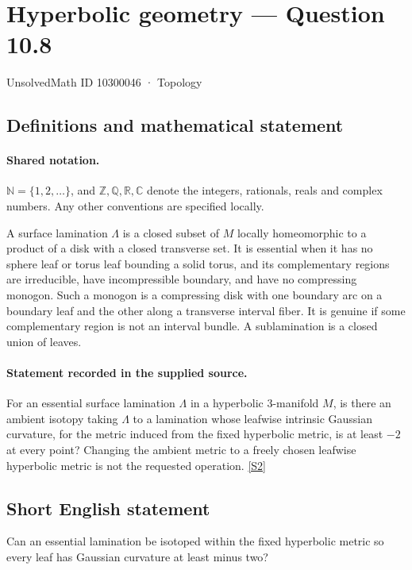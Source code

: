 \documentclass[11pt]{article}
\newcommand{\sref}[2]{\hyperlink{source:#1:#2}{[S#2]}}
\begin{document}
\setcounter{section}{10300045}
\section{Hyperbolic geometry — Question 10.8}\label{10300046}
{\small\sffamily UnsolvedMath ID 10300046 · Topology}
\subsection{Definitions and mathematical statement}

\paragraph{Shared notation.}$\mathbb N=\{1,2,\ldots\}$, and $\mathbb Z,\mathbb Q,\mathbb R,\mathbb C$ denote the integers, rationals, reals and complex numbers. Any other conventions are specified locally.


A surface lamination $\Lambda$ is a closed subset of $M$ locally homeomorphic to a product of a disk with a closed transverse set. It is essential when it has no sphere leaf or torus leaf bounding a solid torus, and its complementary regions are irreducible, have incompressible boundary, and have no compressing monogon. Such a monogon is a compressing disk with one boundary arc on a boundary leaf and the other along a transverse interval fiber. It is genuine if some complementary region is not an interval bundle. A sublamination is a closed union of leaves.
\paragraph{Statement recorded in the supplied source.}
For an essential surface lamination $\Lambda$ in a hyperbolic $3$-manifold $M$, is there an ambient isotopy taking $\Lambda$ to a lamination whose leafwise intrinsic Gaussian curvature, for the metric induced from the fixed hyperbolic metric, is at least $-2$ at every point? Changing the ambient metric to a freely chosen leafwise hyperbolic metric is not the requested operation. \sref{10300046}{2}
\subsection{Short English statement}
Can an essential lamination be isotoped within the fixed hyperbolic metric so every leaf has Gaussian curvature at least minus two?
\end{document}
